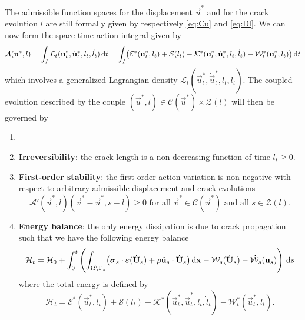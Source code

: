 The admissible function spaces for the displacement $\vec{u}^*$ and for the crack evolution $l$ are still formally given by respectively \eqref{eq:Cu} and \eqref{eq:Dl}. We can now form the space-time action integral given by
\begin{equation} \label{eq:action}
\mathcal{A}(\vec{u}^*,l)=\int_I\mathcal{L}_t(\vec{u}^*_t,\dot{\vec{u}}^*_t,l_t,\dot{l}_t)\D{t}=\int_I\bigl(\mathcal{E}^*(\vec{u}_t^*,l_t)+\mathcal{S}(l_t)-\mathcal{K}^*(\vec{u}_t^*,\dot{\vec{u}}_t^*,l_t,\dot{l}_t)-\mathcal{W}_t^*(\vec{u}_t^*,l_t)\bigr)\D{t}
\end{equation}
which involves a generalized Lagrangian density $\mathcal{L}_t(\vec{u}^*_t,\dot{\vec{u}}^*_t,l_t,\dot{l}_t)$. The coupled evolution described by the couple $(\vec{u}^*,l)\in\mathcal{C}(\vec{u}^*)\times\mathcal{Z}(l)$ will then be governed by
\begin{definition} \label{def:griffith}
\begin{enumerate}
\item[]
\item \textbf{Irreversibility}: the crack length is a non-decreasing function of time $\dot{l}_t\geq 0$.
\item \textbf{First-order stability}: the first-order action variation is non-negative with respect to arbitrary admissible displacement and crack evolutions
\begin{equation} \label{eq:stability}
\mathcal{A}'(\vec{u}^*,l)(\vec{v}^*-\vec{u}^*,s-l)\geq 0\text{ for all $\vec{v}^*\in\mathcal{C}(\vec{u}^*)$ and all $s\in\mathcal{Z}(l)$}.
\end{equation}
\item \textbf{Energy balance}: the only energy dissipation is due to crack propagation such that we have the following energy balance
\begin{equation} \label{eq:eb}
\mathcal{H}_t=\mathcal{H}_0+\int_0^t\left(\int_{\Omega\setminus\Gamma_s}\bigl(\sig_s\cdot\eps(\dot{\vec{U}}_s)+\rho\ddot{\vec{u}}_s\cdot\dot{\vec{U}}_s\bigr)\dx-\mathcal{W}_s(\dot{\vec{U}}_s)-\dot{\mathcal{W}}_s(\vec{u}_s)\right)\D{s}
\end{equation}
where the total energy is defined by
\begin{equation}
\mathcal{H}_t=\mathcal{E}^*(\vec{u}_t^*,l_t)+\mathcal{S}(l_t)+\mathcal{K}^*(\vec{u}_t^*,\dot{\vec{u}}_t^*,l_t,\dot{l}_t)-\mathcal{W}^*_t(\vec{u}_t^*,l_t).
\end{equation}
\end{enumerate}
\end{definition}

